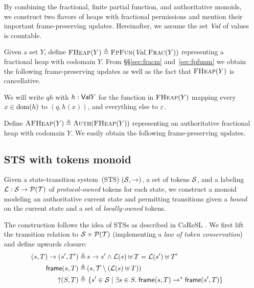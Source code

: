 By combining the fractional, finite partial function, and authoritative monoids, we construct two flavors of heaps with fractional permissions and mention their important frame-preserving updates.
Hereinafter, we assume the set $\textit{Val}$ of values is countable.

Given a set $Y$, define $\textsc{FHeap}(Y) \triangleq \textsc{FpFun}(\textit{Val}, \textsc{Frac}(Y))$ representing a fractional heap with codomain $Y$.
From \S\S\ref{sec:fracm} and~\ref{sec:fpfunm} we obtain the following frame-preserving updates as well as the fact that $\textsc{FHeap}(Y)$ is cancellative.
We will write $qh$ with $h : \textsf{Val}  Y$ for the function in $\textsc{FHeap}(Y)$ mapping every $x \in \textrm{dom}(h)$ to $(q, h(x))$, and everything else to $\mathord{\varepsilon}$.

Define $\textsc{AFHeap}(Y) \triangleq \textsc{Auth}(\textsc{FHeap}(Y))$ representing an authoritative fractional heap with codomain $Y$.
We easily obtain the following frame-preserving updates.

\subsection{STS with tokens monoid}
\label{sec:stsmon}


Given a state-transition system~(STS) $(\mathcal{S}, \rightarrow)$, a set of tokens $\mathcal{S}$, and a labeling $\mathcal{L}: \mathcal{S} \rightarrow \mathcal{P}(\mathcal{T})$ of \emph{protocol-owned} tokens for each state, we construct a monoid modeling an authoritative current state and permitting transitions given a \emph{bound} on the current state and a set of \emph{locally-owned} tokens.

The construction follows the idea of STSs as described in CaReSL \cite{caresl}.
We first lift the transition relation to $\mathcal{S} \times \mathcal{P}(\mathcal{T})$ (implementing a \emph{law of token conservation}) and define upwards closure:
\begin{align*}
 (s, T) \rightarrow (s', T') \triangleq&\, s \rightarrow s' \land \mathcal{L}(s) \uplus T = \mathcal{L}(s') \uplus T' \\
 \textsf{frame}(s, T) \triangleq&\, (s, \mathcal{T} \setminus (\mathcal{L}(s) \uplus T)) \\
 \mathord{\uparrow}(S, T) \triangleq&\, \left\{ s' \in \mathcal{S}\;\middle|\;\exists s \in S.\; \textsf{frame}(s, T) \rightarrow^{*} \textsf{frame}(s', T) \right\}
\end{align*}

